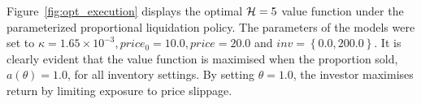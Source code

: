 %

Figure~\ref{fig:opt_execution} displays the optimal {\footnotesize$ \mathcal{H} = 5 $} value function under the parameterized proportional liquidation policy. The parameters of the models were set to {\footnotesize$ \kappa = 1.65 \times 10^{-3}, price_0 = 10.0, price = 20.0$} and {\footnotesize $inv = \left\lbrace 0.0, 200.0\right\rbrace$}. It is clearly evident that the value function is maximised when the proportion sold, {\footnotesize $a\left( \theta \right) = 1.0$}, for all inventory settings. By setting {\footnotesize $\theta = 1.0$}, the investor maximises return by limiting exposure to price slippage.

